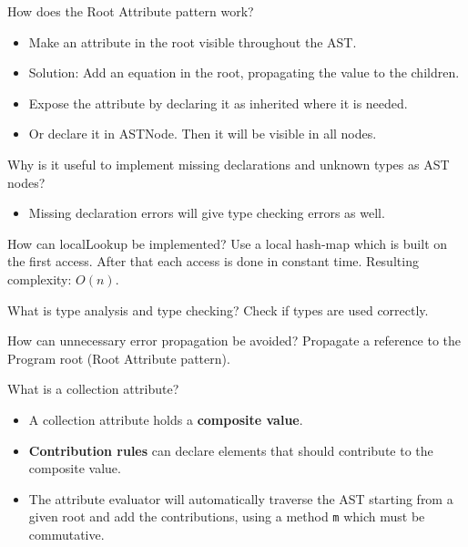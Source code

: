\documentclass[11pt]{beamer}
\begin{document}
\begin{frame}
\begin{block}{How does the Root Attribute pattern work? }
\begin{itemize}
\item Make an attribute in the root visible throughout the AST.
\item Solution: Add an equation in the root, propagating the value to the children.
\item Expose the attribute by declaring it as inherited where it is needed.
\item Or declare it in ASTNode. Then it will be visible in all nodes.
\end{itemize}
\end{block}

\begin{block}{Why is it useful to implement missing declarations and unknown types as AST nodes?}
\begin{itemize}
\item Missing declaration errors will give type checking errors as well.
\end{itemize}
\end{block}


\end{frame}

\begin{frame}
\begin{block}{How can localLookup be implemented? }
Use a local hash-map which is built on the first access. After that each access is done in constant time. Resulting complexity: $O(n)$.
\end{block}
\end{frame}

\begin{frame}

\begin{block}{What is type analysis and type checking? }
Check if types are used correctly.
\end{block}



\begin{block}{How can unnecessary error propagation be avoided? }
Propagate a reference to the Program root (Root Attribute pattern).
\end{block}


\begin{block}{What is a collection attribute? }
\begin{itemize}
\item A collection attribute holds a \textbf{composite value}.
\item \textbf{Contribution rules} can declare elements that should contribute to the composite value.
\item The attribute evaluator will automatically traverse the AST starting from a given root and add the contributions, using a method \texttt{m} which must be commutative.
\end{itemize}
\end{block}


\end{frame}
\end{document}
